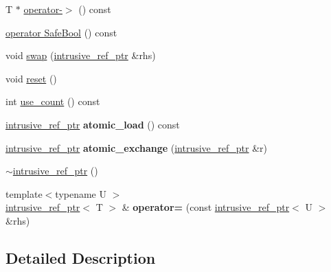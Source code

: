 \begin{DoxyCompactItemize}
\item 
T $\ast$ \hyperlink{classmiosix_1_1intrusive__ref__ptr_ab8da77341bdf726f59654734504f20a5}{operator-\/$>$} () const 
\item 
\hyperlink{classmiosix_1_1intrusive__ref__ptr_a31052b6734e890c0ada97802d3c93b27}{operator Safe\-Bool} () const 
\item 
void \hyperlink{classmiosix_1_1intrusive__ref__ptr_ae18b634a51ea78219eb073a40cd9adfe}{swap} (\hyperlink{classmiosix_1_1intrusive__ref__ptr}{intrusive\-\_\-ref\-\_\-ptr} \&rhs)
\item 
void \hyperlink{classmiosix_1_1intrusive__ref__ptr_a6ac0bfc8ad709346328c7daa157d89e1}{reset} ()
\item 
int \hyperlink{classmiosix_1_1intrusive__ref__ptr_ac530978dc3eb430e5845b4166e3d0395}{use\-\_\-count} () const 
\item 
\hypertarget{classmiosix_1_1intrusive__ref__ptr_a379c406ea6285861137d8de6efd747d1}{\hyperlink{classmiosix_1_1intrusive__ref__ptr}{intrusive\-\_\-ref\-\_\-ptr} {\bfseries atomic\-\_\-load} () const }\label{classmiosix_1_1intrusive__ref__ptr_a379c406ea6285861137d8de6efd747d1}

\item 
\hypertarget{classmiosix_1_1intrusive__ref__ptr_ad30d0133e10223766c4011005e243799}{\hyperlink{classmiosix_1_1intrusive__ref__ptr}{intrusive\-\_\-ref\-\_\-ptr} {\bfseries atomic\-\_\-exchange} (\hyperlink{classmiosix_1_1intrusive__ref__ptr}{intrusive\-\_\-ref\-\_\-ptr} \&r)}\label{classmiosix_1_1intrusive__ref__ptr_ad30d0133e10223766c4011005e243799}

\item 
\hyperlink{classmiosix_1_1intrusive__ref__ptr_a2346627ae66994ad943b3672ecdb8355}{$\sim$intrusive\-\_\-ref\-\_\-ptr} ()
\item 
\hypertarget{classmiosix_1_1intrusive__ref__ptr_a65c069c536167fbb21f503f8b2764a70}{{\footnotesize template$<$typename U $>$ }\\\hyperlink{classmiosix_1_1intrusive__ref__ptr}{intrusive\-\_\-ref\-\_\-ptr}$<$ T $>$ \& {\bfseries operator=} (const \hyperlink{classmiosix_1_1intrusive__ref__ptr}{intrusive\-\_\-ref\-\_\-ptr}$<$ U $>$ \&rhs)}\label{classmiosix_1_1intrusive__ref__ptr_a65c069c536167fbb21f503f8b2764a70}

\end{DoxyCompactItemize}


\subsection{Detailed Description}
